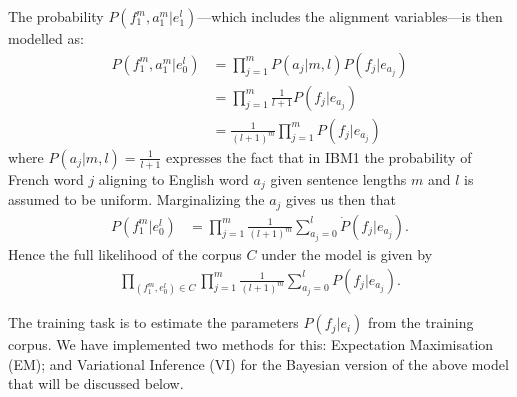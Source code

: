 \documentclass[11pt,a4paper]{article}
\begin{document}
The probability $P(f_1^m, a_1^m|e_1^l)$---which includes the alignment variables---is then modelled as:
\begin{align*}
    P(f_1^m, a_1^m|e_0^l) &= \prod^m_{j=1}P(a_j|m, l) P(f_j | e_{a_j}) \\
        &= \prod^m_{j=1}\frac{1}{l+1} P(f_j | e_{a_j}) \\
        &= \frac{1}{(l+1)^m} \prod^m_{j=1} P(f_j | e_{a_j})
\end{align*}
where $P(a_j|m, l) = \frac{1}{l+1}$ expresses the fact that in IBM1 the probability of French word $j$ aligning to English word $a_j$ given sentence lengths $m$ and $l$ is assumed to be uniform. Marginalizing the $a_j$ gives us then that
\begin{align*}
    P(f_1^m |e_0^l) &= \prod^m_{j=1} \frac{1}{(l+1)^m} \sum_{a_j=0}^l  \dot P(f_j | e_{a_j}).
\end{align*}
Hence the full likelihood of the corpus $C$ under the model is given by
\begin{align}
    \prod_{(f_1^m,e_0^l)\in C}\prod_{j=1}^m  \frac{1}{(l+1)^m}\sum_{a_j=0}^l P(f_j | e_{a_j}).
\end{align}

The training task is to estimate the parameters $P(f_j | e_i)$ from the training corpus. We have implemented two methods for this: Expectation Maximisation (EM); and Variational Inference (VI) for the Bayesian version of the above model that will be discussed below.





\end{document}
